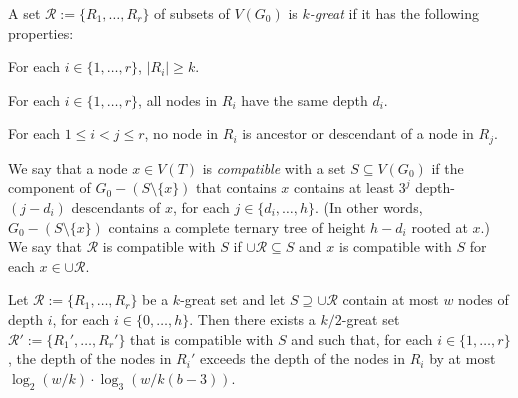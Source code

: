 \documentclass{patmorin}
\newcommand{\defin}[1]{\emph{\color{brightmaroon}#1}}
\begin{document}
A set $\mathcal{R}:=\{R_1,\ldots,R_r\}$ of subsets of $V(G_0)$ is \defin{$k$-great} if it has the following properties:

\begin{compactenum}
  \item For each $i\in\{1,\ldots,r\}$, $|R_i|\ge k$.
  \item For each $i\in\{1,\ldots,r\}$, all nodes in $R_i$ have the same depth $d_i$.
  \item For each $1\le i<j\le r$, no node in $R_i$ is ancestor or descendant of a node in $R_j$.
\end{compactenum}

We say that a node $x\in V(T)$ is \defin{compatible} with a set $S\subseteq V(G_0)$ if the component of $G_0-(S\setminus\{x\})$ that contains $x$ contains at least $3^j$ depth-$(j-d_i)$ descendants of $x$, for each $j\in\{d_i,\ldots,h\}$.  (In other words, $G_0-(S\setminus\{x\})$ contains a complete ternary tree of height $h-d_i$ rooted at $x$.)  We say that $\mathcal{R}$ is compatible with $S$ if $\cup\mathcal{R}\subseteq S$ and $x$ is compatible with $S$ for each $x\in\cup\mathcal{R}$.  


\begin{lem}\label{compatible_set}
  Let $\mathcal{R}:=\{R_1,\ldots,R_r\}$ be a $k$-great set and let $S\supseteq \cup\mathcal{R}$ contain at most $w$ nodes of depth $i$, for each $i\in\{0,\ldots,h\}$.  Then there exists a $k/2$-great set $\mathcal{R}':=\{R_1',\ldots,R_r'\}$ that is compatible with $S$ and such that, for each $i\in\{1,\ldots,r\}$, the depth of the nodes in $R_i'$ exceeds the depth of the nodes in $R_i$ by at most $\log_2(w/k)\cdot\log_3(w/k(b-3))$.
\end{lem}
\end{document}
